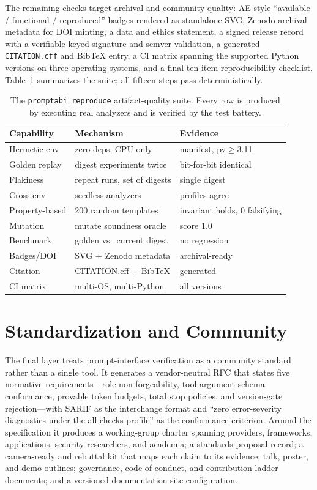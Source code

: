 \documentclass[10pt]{article}
\begin{document}
The remaining checks target archival and community quality: AE-style
``available / functional / reproduced'' badges rendered as standalone SVG,
Zenodo archival metadata for DOI minting, a data and ethics statement, a signed
release record with a verifiable keyed signature and semver validation, a
generated \texttt{CITATION.cff} and BibTeX entry, a CI matrix spanning the
supported Python versions on three operating systems, and a final ten-item
reproducibility checklist. Table~\ref{tab:reproducibility} summarizes the suite;
all fifteen steps pass deterministically.

\begin{table}[t]
\centering
\small
\begin{tabular}{@{}lll@{}}
\toprule
Capability & Mechanism & Evidence \\
\midrule
Hermetic env & zero deps, CPU-only & manifest, py$\geq$3.11 \\
Golden replay & digest experiments twice & bit-for-bit identical \\
Flakiness & repeat runs, set of digests & single digest \\
Cross-env & seedless analyzers & profiles agree \\
Property-based & 200 random templates & invariant holds, 0 falsifying \\
Mutation & mutate soundness oracle & score $1.0$ \\
Benchmark & golden vs.\ current digest & no regression \\
Badges/DOI & SVG + Zenodo metadata & archival-ready \\
Citation & CITATION.cff + BibTeX & generated \\
CI matrix & multi-OS, multi-Python & all versions \\
\bottomrule
\end{tabular}
\caption{The \texttt{promptabi reproduce} artifact-quality suite. Every row is
produced by executing real analyzers and is verified by the test battery.}
\label{tab:reproducibility}
\end{table}


\section{Standardization and Community}
The final layer treats prompt-interface verification as a community standard
rather than a single tool. It generates a vendor-neutral RFC that states five
normative requirements---role non-forgeability, tool-argument schema conformance,
provable token budgets, total stop policies, and version-gate rejection---with
SARIF as the interchange format and ``zero error-severity diagnostics under the
all-checks profile'' as the conformance criterion. Around the specification it
produces a working-group charter spanning providers, frameworks, applications,
security researchers, and academia; a standards-proposal record; a camera-ready
and rebuttal kit that maps each claim to its evidence; talk, poster, and demo
outlines; governance, code-of-conduct, and contribution-ladder documents; and a
versioned documentation-site configuration.
\end{document}

